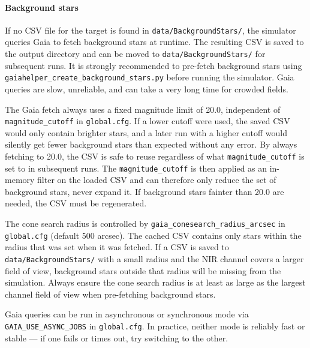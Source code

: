 \paragraph{Background stars} If no CSV file for the target is found in \texttt{data/BackgroundStars/}, the simulator queries Gaia to fetch background stars at runtime. The resulting CSV is saved to the output directory and can be moved to \texttt{data/BackgroundStars/} for subsequent runs. It is strongly recommended to pre-fetch background stars using \texttt{gaiahelper\_create\_background\_stars.py} before running the simulator. Gaia queries are slow, unreliable, and can take a very long time for crowded fields.

The Gaia fetch always uses a fixed magnitude limit of 20.0, independent of \texttt{magnitude\_cutoff} in \texttt{global.cfg}. If a lower cutoff were used, the saved CSV would only contain brighter stars, and a later run with a higher cutoff would silently get fewer background stars than expected without any error. By always fetching to 20.0, the CSV is safe to reuse regardless of what \texttt{magnitude\_cutoff} is set to in subsequent runs. The \texttt{magnitude\_cutoff} is then applied as an in-memory filter on the loaded CSV and can therefore only reduce the set of background stars, never expand it. If background stars fainter than 20.0 are needed, the CSV must be regenerated.

The cone search radius is controlled by \texttt{gaia\_conesearch\_radius\_arcsec} in \texttt{global.cfg} (default 500 arcsec). The cached CSV contains only stars within the radius that was set when it was fetched. If a CSV is saved to \texttt{data/BackgroundStars/} with a small radius and the NIR channel covers a larger field of view, background stars outside that radius will be missing from the simulation. Always ensure the cone search radius is at least as large as the largest channel field of view when pre-fetching background stars.

Gaia queries can be run in asynchronous or synchronous mode via \texttt{GAIA\_USE\_ASYNC\_JOBS} in \texttt{global.cfg}. In practice, neither mode is reliably fast or stable — if one fails or times out, try switching to the other.

